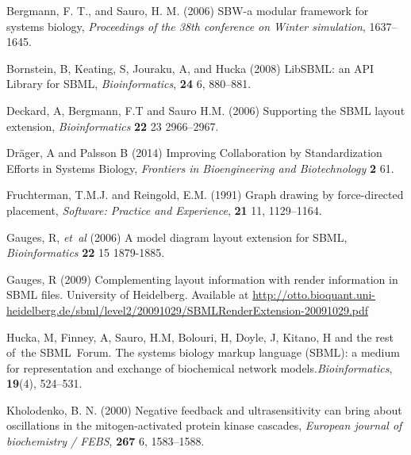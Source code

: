 \documentclass{bioinfo}
\begin{document}
\makeatletter
\renewcommand\@biblabel[1]{}
\makeatother

\begin{thebibliography}{}

 Bergmann, F. T., and Sauro, H. M. (2006) SBW-a modular framework for systems biology, {\it Proceedings of the 38th conference on Winter simulation}, 1637--1645.

 Bornstein, B, Keating, S, Jouraku, A, and Hucka (2008) LibSBML: an API Library for SBML, {\it Bioinformatics}, {\bf 24} 6, 880--881.

 Deckard, A, Bergmann, F.T and Sauro H.M. (2006) Supporting the SBML layout extension, {\it Bioinformatics} {\bf 22} 23 2966--2967.

 Dr\"{a}ger, A and Palsson B (2014) Improving Collaboration by Standardization Efforts in Systems Biology, {\it Frontiers in Bioengineering and Biotechnology} {\bf 2} 61.

 Fruchterman, T.M.J. and Reingold, E.M. (1991) Graph drawing by force-directed placement, {\it Software: Practice and Experience}, {\bf 21} 11, 1129--1164.

 Gauges, R, {\it et~al} (2006) A model diagram layout extension for SBML, {\it Bioinformatics} {\bf 22} 15 1879-1885.

 Gauges, R (2009) Complementing layout information with render information in SBML files.  University of Heidelberg. Available at \href{http://otto.bioquant.uni-heidelberg.de/sbml/level2/20091029/SBMLRenderExtension-20091029.pdf}{http://otto.bioquant.uni-heidelberg.de/sbml/level2/20091029/SBMLRenderExtension-20091029.pdf}

 Hucka, M, Finney, A, Sauro, H.M, Bolouri, H, Doyle, J, Kitano, H and
  the rest of~the SBML~Forum. The systems biology markup language (SBML): a medium for representation and exchange of biochemical network models.{\em Bioinformatics\/}, {\bf 19}(4), 524--531.

 Kholodenko, B. N. (2000) Negative feedback and ultrasensitivity can bring about oscillations in the mitogen-activated protein kinase cascades, {\it European journal of biochemistry / FEBS}, {\bf 267} 6, 1583--1588.


\end{thebibliography}
\end{document}
